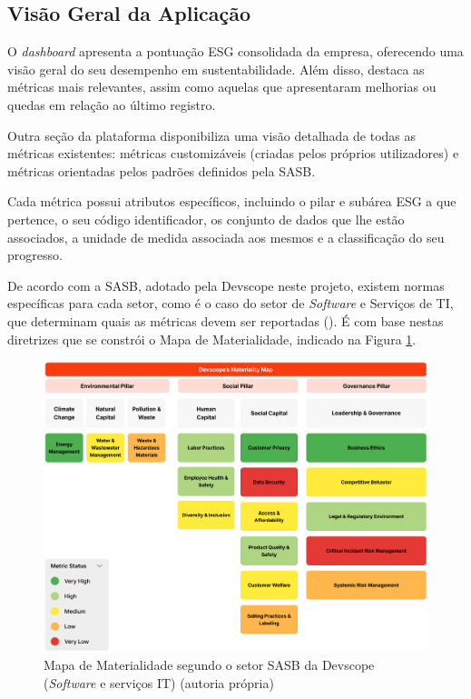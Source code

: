 \subsection{Visão Geral da Aplicação}
\label{subsec:VGA} 

O \textit{dashboard} apresenta a pontuação ESG consolidada da empresa, oferecendo uma visão geral do seu desempenho em sustentabilidade. Além disso, destaca as métricas mais relevantes, assim como aquelas que apresentaram melhorias ou quedas em relação ao último registro.

Outra seção da plataforma disponibiliza uma visão detalhada de todas as métricas existentes: métricas customizáveis (criadas pelos próprios utilizadores) e métricas orientadas pelos padrões definidos pela \gls{SASB}.

Cada métrica possui atributos específicos, incluindo o pilar e subárea ESG a que pertence, o seu código identificador, os conjunto de dados que lhe estão associados, a unidade de medida associada aos mesmos e a classificação do seu progresso.

De acordo com a \gls{SASB}, adotado pela Devscope neste projeto, existem normas específicas para cada setor, como é o caso do setor de \textit{Software} e Serviços de TI, que determinam quais as métricas devem ser reportadas (\cite{SASBSector2025}). É com base nestas diretrizes que se constrói o Mapa de Materialidade, indicado na Figura \ref{fig:materiality_map}.

\begin{figure}[H]
    \centering
    \includegraphics[width=5in]{frontmatter/assets/mapa-materialidade.png}
    \caption{Mapa de Materialidade segundo o setor SASB da Devscope (\textit{Software} e serviços IT) (autoria própria)}
    \label{fig:materiality_map}
\end{figure}

